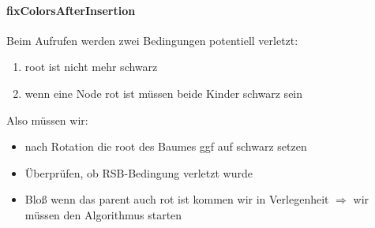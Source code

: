 \documentclass[
    ngerman,
    color=3b,
    dark_mode,
    load_common, %
    summary,
    boxarc,
]{tuda_summary}
\begin{document}
\paragraph{fixColorsAfterInsertion}
Beim Aufrufen werden zwei Bedingungen potentiell verletzt:
\begin{enumerate}
    \item root ist nicht mehr schwarz
    \item wenn eine Node rot ist müssen beide Kinder schwarz sein
\end{enumerate}
Also müssen wir:
\begin{itemize}
    \item nach Rotation die root des Baumes ggf auf schwarz setzen
    \item Überprüfen, ob RSB-Bedingung verletzt wurde
    \item Blo\ss{} wenn das parent auch rot ist kommen wir in Verlegenheit $\Longrightarrow$ wir müssen den Algorithmus starten
\end{itemize}
\end{document}
